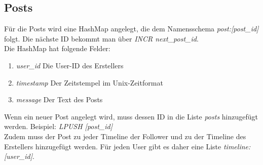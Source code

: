 \documentclass[
    a4paper
]{scrreprt}
\begin{document}
	
	\subsection*{Posts}
		Für die Posts wird eine HashMap angelegt, die dem Namensschema \textit{post:[post\_id]} folgt. Die nächste ID bekommt man über \textit{INCR next\_post\_id}. \\
		Die HashMap hat folgende Felder:
		\begin{enumerate}
			\item \textit{user\_id} {Die User-ID des Erstellers}
			\item \textit{timestamp} {Der Zeitstempel im Unix-Zeitformat}
			\item \textit{message} {Der Text des Posts}
		\end{enumerate}
		
		Wenn ein neuer Post angelegt wird, muss dessen ID in die Liste \textit{posts} hinzugefügt werden. Beispiel: \textit{ LPUSH [post\_id]} \\
		Zudem muss der Post zu jeder Timeline der Follower und zu der Timeline des Erstellers hinzugefügt werden.
		Für jeden User gibt es daher eine Liste \textit{timeline:[user\_id]}.
	



\end{document}

